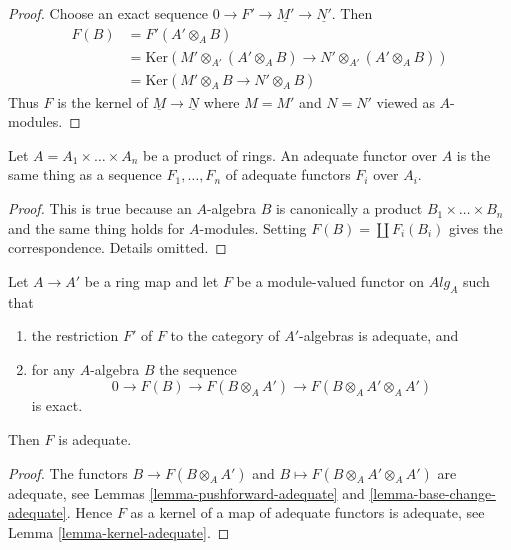\begin{proof}
Choose an exact sequence $0 \to F' \to \underline{M'} \to \underline{N'}$.
Then
\begin{align*}
F(B) & = F'(A' \otimes_A B) \\
& = \text{Ker}(M' \otimes_{A'} (
A' \otimes_A B) \to N' \otimes_{A'} (A' \otimes_A B)) \\
& = \text{Ker}(M' \otimes_A B \to N' \otimes_A B)
\end{align*}
Thus $F$ is the kernel of
$\underline{M} \to \underline{N}$
where $M = M'$ and $N = N'$ viewed as $A$-modules.
\end{proof}

\begin{lemma}
\label{lemma-adequate-product}
Let $A = A_1 \times \ldots \times A_n$ be a product of rings.
An adequate functor over $A$ is the same thing as a sequence
$F_1, \ldots, F_n$ of adequate functors $F_i$ over $A_i$.
\end{lemma}

\begin{proof}
This is true because an $A$-algebra $B$ is canonically a product
$B_1 \times \ldots \times B_n$ and the same thing holds for $A$-modules.
Setting $F(B) = \coprod F_i(B_i)$ gives the correspondence.
Details omitted.
\end{proof}

\begin{lemma}
\label{lemma-adequate-descent}
Let $A \to A'$ be a ring map and let $F$ be a module-valued functor on
$\textit{Alg}_A$ such that
\begin{enumerate}
\item the restriction $F'$ of $F$ to the category of $A'$-algebras is
adequate, and
\item for any $A$-algebra $B$ the sequence
$$
0 \to F(B) \to F(B \otimes_A A') \to F(B \otimes_A A' \otimes_A A')
$$
is exact.
\end{enumerate}
Then $F$ is adequate.
\end{lemma}

\begin{proof}
The functors $B \to F(B \otimes_A A')$ and
$B \mapsto F(B \otimes_A A' \otimes_A A')$ are adequate, see
Lemmas \ref{lemma-pushforward-adequate} and
\ref{lemma-base-change-adequate}.
Hence $F$ as a kernel of a map of adequate functors is adequate, see
Lemma \ref{lemma-kernel-adequate}.
\end{proof}






